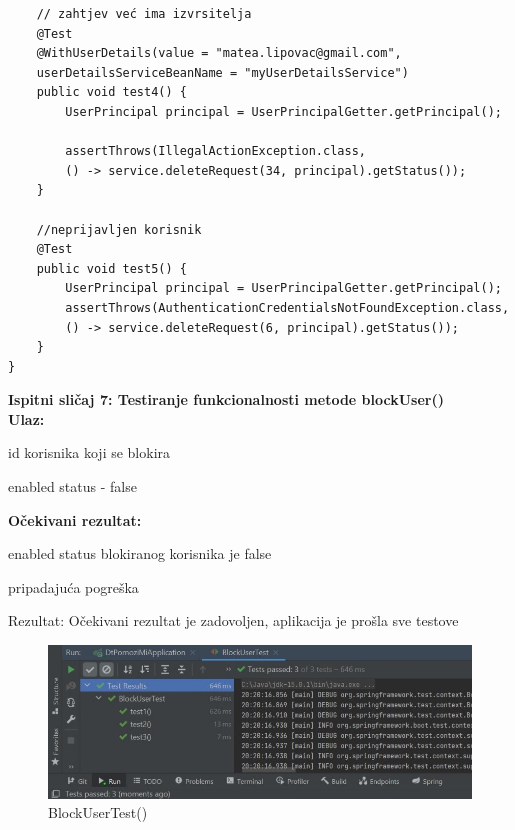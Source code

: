 \begin{verbatim}
	// zahtjev već ima izvrsitelja
	@Test
	@WithUserDetails(value = "matea.lipovac@gmail.com",
	userDetailsServiceBeanName = "myUserDetailsService")
	public void test4() {
		UserPrincipal principal = UserPrincipalGetter.getPrincipal();

		assertThrows(IllegalActionException.class, 
		() -> service.deleteRequest(34, principal).getStatus());
	}

	//neprijavljen korisnik
	@Test
	public void test5() {
		UserPrincipal principal = UserPrincipalGetter.getPrincipal();
		assertThrows(AuthenticationCredentialsNotFoundException.class, 
		() -> service.deleteRequest(6, principal).getStatus());
	}
}
            \end{verbatim}
            
            \medskip
			
			\noindent \textbf{Ispitni sličaj 7: Testiranje funkcionalnosti metode blockUser()}\\
			
			\medskip
            \noindent\textbf{Ulaz:}
            \begin{packed_enum}
            \item id korisnika koji se blokira
            \item enabled status - false
            \end{packed_enum}
            
            \noindent\textbf{Očekivani rezultat:}
            \begin{packed_enum}
            \item enabled status blokiranog korisnika je false
            \item pripadajuća pogreška
            \end{packed_enum}
            
            \noindent \text
            Rezultat: Očekivani rezultat je zadovoljen, aplikacija je prošla sve testove \\
            
            \begin{figure}[H]
                 \includegraphics[width=\textwidth, height=\textheight, keepaspectratio]{slike/BlockUserTest.jpeg}
                \cntering
                \caption{BlockUserTest()}
            \end{figure}
            
